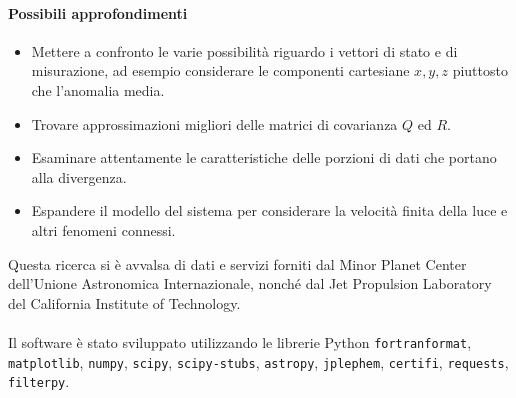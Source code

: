 \documentclass[12pt,a4paper,openright,twoside]{book}
\begin{document}
\paragraph{Possibili approfondimenti}

\begin{itemize}
\item Mettere a confronto le varie possibilità riguardo i vettori di stato e di misurazione, ad esempio considerare le componenti cartesiane $x,y,z$ piuttosto che l'anomalia media.
\item Trovare approssimazioni migliori delle matrici di covarianza $Q$ ed $R$.
\item Esaminare attentamente le caratteristiche delle porzioni di dati che portano alla divergenza.
\item Espandere il modello del sistema per considerare la velocità finita della luce e altri fenomeni connessi.
\end{itemize}

\backmatter


% 



\begin{acknowledgements} %
Questa ricerca si è avvalsa di dati e servizi forniti dal Minor Planet Center dell'Unione Astronomica Internazionale, nonché dal Jet Propulsion Laboratory del California Institute of Technology. \\\null\\
Il software è stato sviluppato utilizzando le librerie Python \lstinline{fortranformat},\\ \lstinline{matplotlib}, \lstinline{numpy}, \lstinline{scipy}, \lstinline{scipy-stubs}, \lstinline{astropy}, \lstinline{jplephem}, \lstinline{certifi}, \lstinline{requests}, \lstinline{filterpy}.
\end{acknowledgements}
\end{document}
